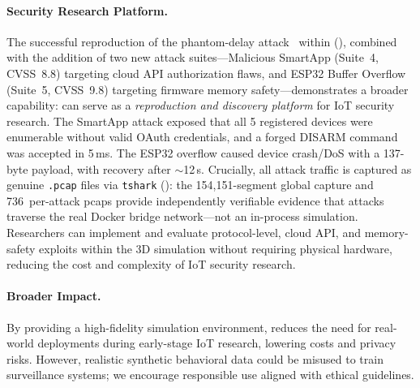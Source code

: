 \paragraph{Security Research Platform.}
The successful reproduction of the phantom-delay
attack~\cite{phantom-delay} within \sys{}
(), combined with the addition of
two new attack suites---Malicious SmartApp (Suite~4, CVSS~8.8)
targeting cloud API authorization flaws, and ESP32 Buffer Overflow
(Suite~5, CVSS~9.8) targeting firmware memory safety---demonstrates
a broader capability: \sys{} can serve as a \emph{reproduction and
discovery platform} for IoT security research.
The SmartApp attack exposed that all 5 registered devices were
enumerable without valid OAuth credentials, and a forged DISARM
command was accepted in 5\,ms.  The ESP32 overflow caused device
crash/DoS with a 137-byte payload, with recovery after $\sim$12\,s.
Crucially, all attack traffic is captured as genuine
\texttt{.pcap} files via \texttt{tshark}
(): the 154{,}151-segment global capture
and 736~per-attack pcaps provide independently verifiable
evidence that attacks traverse the real Docker bridge
network---not an in-process simulation.
Researchers can implement and evaluate protocol-level, cloud API,
and memory-safety exploits within the 3D simulation without
requiring physical hardware, reducing the cost and complexity of
IoT security research.

\paragraph{Broader Impact.}
By providing a high-fidelity simulation environment, \sys{} reduces
the need for real-world deployments during early-stage IoT research,
lowering costs and privacy risks.  However, realistic synthetic
behavioral data could be misused to train surveillance systems;
we encourage responsible use aligned with ethical guidelines.
